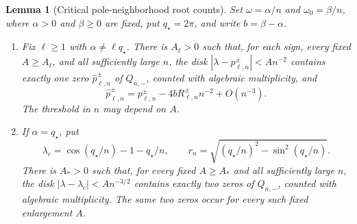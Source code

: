 \documentclass[twoside,10pt]{article}
\numberwithin{equation}{section}
\theoremstyle{slbody}
\newtheorem{lemma}[theorem]{Lemma}
\theoremstyle{definition}
\theoremstyle{remark}
\begin{document}
\begin{lemma}[Critical pole-neighborhood root counts]
\label{lem:critical-pole-counts}
Set $\omega=\alpha/n$ and $\omega_0=\beta/n$, where
$\alpha>0$ and $\beta\ge0$ are fixed, put $q_\star=2\pi$, and write
$b=\beta-\alpha$.
\begin{enumerate}
\item Fix $\ell\ge1$ with $\alpha\ne\ell q_\star$.  There is
  $A_{\ell}>0$ such that, for each sign, every fixed
  $A\ge A_{\ell}$, and all sufficiently large $n$, the disk
  $|\lambda-p_{\ell,n}^{\pm}|<An^{-2}$ contains exactly one zero
  $\widehat p_{\ell,n}^{\pm}$ of $Q_{n,-}$, counted with algebraic
  multiplicity, and
  \begin{equation}\label{eq:critical-uniform-simple-shift}
   \widehat p_{\ell,n}^\pm
   =p_{\ell,n}^\pm
    -4bR_{\ell,n}^\pm n^{-2}+O(n^{-3}).
  \end{equation}
  The threshold in $n$ may depend on $A$.
\item If $\alpha=q_\star$, put
  \[
   \lambda_c=\cos(q_\star/n)-1-q_\star/n,
   \qquad
   r_n=\sqrt{(q_\star/n)^2-\sin^2(q_\star/n)}.
  \]
  There is $A_*>0$ such that, for every fixed $A\ge A_*$ and all
  sufficiently large $n$, the disk
  $|\lambda-\lambda_c|<An^{-3/2}$ contains exactly two zeros of
  $Q_{n,-}$, counted with algebraic multiplicity.  The same two zeros
  occur for every such fixed enlargement $A$.
\end{enumerate}
\end{lemma}
\end{document}
